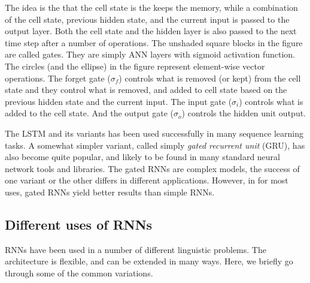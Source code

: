 The idea is the that the cell state is the keeps the memory,
while a combination of the cell state, previous hidden state,
and the current input is passed to the output layer.
Both the cell state and the hidden layer is also passed to the next
time step after a number of operations.
The unshaded square blocks in the figure are called gates.
They are simply ANN layers with sigmoid activation function.
The circles (and the ellipse) in the figure represent 
element-wise vector operations.
The forget gate ($\sigma_{f}$)
controls what is removed (or kept) from the cell state
and they control what is removed, and added to cell state
based on the previous hidden state and the current input.
The input gate ($\sigma_{i}$) controls what is added to the cell state.
And the output gate ($\sigma_{o}$) controls the hidden unit output.

The LSTM and its variants has been used successfully
in many sequence learning tasks.
A somewhat simpler variant,
called simply \emph{gated recurrent unit} (GRU),
has also become quite popular,
and likely to be found in many standard neural network tools and libraries.
The gated RNNs are complex models,
the success of one variant or the other differs in different applications.
However, in for most uses, gated RNNs yield better results than simple RNNs.

\subsection{Different uses of RNNs}

RNNs have been used in a number of different linguistic problems.
The architecture is flexible, and can be extended in many ways.
Here, we briefly go through some of the common variations.

